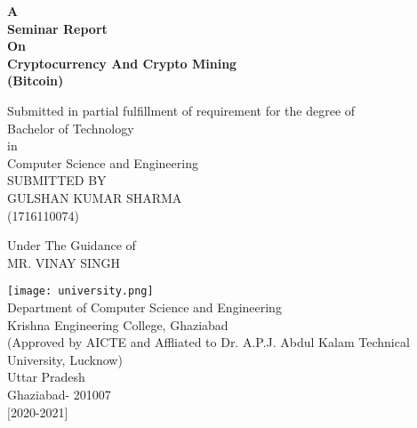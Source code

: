 \begin{titlepage}
	\begin{center}
		\vspace*{1cm}
		
		\textbf{\Huge{A\\Seminar Report\\On\vspace{.3cm} \\Cryptocurrency And Crypto Mining \vspace{.3cm} \\(Bitcoin)}}

		\vspace{1.5cm}
		
		
		
		Submitted in partial fulfillment of requirement for the degree of\\
		Bachelor of Technology \\
		in\\
		Computer Science and Engineering\\
		\vspace{.3cm}
		SUBMITTED BY\\
		GULSHAN KUMAR SHARMA\\
		(1716110074)
		
		\vspace{1cm}
		
		Under The Guidance of\\
		MR. VINAY SINGH
		
		\vspace{1.8cm}
		
		\texttt{[image: university.png]}
		\vspace{1.5cm}
		\\Department of Computer Science and 
		Engineering\\
		Krishna Engineering College, Ghaziabad\\
		(Approved by AICTE and Affliated to Dr. A.P.J. Abdul Kalam Technical University, Lucknow)\\
		Uttar Pradesh\\
		Ghaziabad- 201007\\
		$[$2020-2021$]$
				
	\end{center}
\end{titlepage}